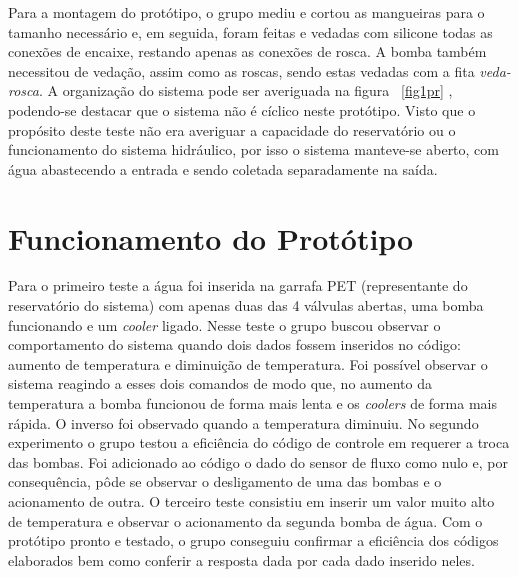 \newpage
Para a montagem do protótipo, o grupo mediu e cortou as mangueiras para o tamanho necessário e, em seguida, foram feitas e vedadas com silicone todas as conexões de encaixe, restando apenas as conexões de rosca. A bomba também necessitou de vedação, assim como as roscas, sendo estas vedadas com a fita \emph{veda-rosca}. A organização do sistema pode ser averiguada na figura ~\ref{fig1pr} , podendo-se destacar que o sistema não é cíclico neste protótipo. Visto que o propósito deste teste não era averiguar a capacidade do reservatório ou o funcionamento do sistema hidráulico, por isso o sistema manteve-se aberto, com água abastecendo a entrada e sendo coletada separadamente na saída.
\section{Funcionamento do Protótipo}
Para o primeiro teste a água foi inserida na garrafa PET (representante do reservatório do sistema) com apenas duas das 4 válvulas abertas, uma bomba funcionando e um \textit{cooler} ligado. Nesse teste o grupo buscou observar o comportamento do sistema quando dois dados fossem inseridos no código: aumento de temperatura e diminuição de temperatura. Foi possível observar o sistema reagindo a esses dois comandos de modo que, no aumento da temperatura a bomba funcionou de forma mais lenta e os \textit{coolers} de forma mais rápida. O inverso foi observado quando a temperatura diminuiu.
No segundo experimento o grupo testou a eficiência do código de controle em requerer a troca das bombas. Foi adicionado ao código o dado do sensor de fluxo como nulo e, por consequência, pôde se observar o desligamento de uma das bombas e o acionamento de outra.  
O terceiro teste consistiu em inserir um valor muito alto de temperatura e observar o acionamento da segunda bomba de água.
Com o protótipo pronto e testado, o grupo conseguiu confirmar a eficiência dos códigos elaborados bem como conferir a resposta dada por cada dado inserido neles.
